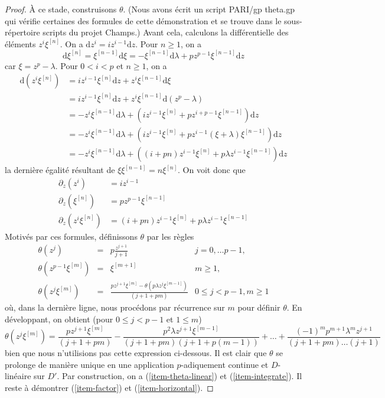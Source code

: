 \begin{proof}
\medskip\noindent
À ce stade, construisons $\theta$. (Nous avons écrit un script PARI/gp theta.gp
qui vérifie certaines des formules de cette démonstration et se trouve dans le
sous-répertoire scripts du projet Champs.) Avant cela, calculons
la différentielle des éléments $z^i \xi^{[n]}$. On a
$\text{d}z^i = i z^{i - 1} \text{d}z$. Pour $n \geq 1$, on a
$$
\text{d}\xi^{[n]} =
\xi^{[n - 1]} \text{d}\xi =
- \xi^{[n - 1]}\text{d}\lambda + p z^{p - 1} \xi^{[n - 1]}\text{d}z
$$
car $\xi = z^p - \lambda$. Pour $0 < i < p$ et $n \geq 1$, on a
\begin{align*}
\text{d}(z^i\xi^{[n]})
& =
iz^{i - 1}\xi^{[n]}\text{d}z + z^i\xi^{[n - 1]}\text{d}\xi \\
& =
iz^{i - 1}\xi^{[n]}\text{d}z + z^i\xi^{[n - 1]}\text{d}(z^p - \lambda) \\
& =
- z^i\xi^{[n - 1]}\text{d}\lambda +
(iz^{i - 1}\xi^{[n]} + pz^{i + p - 1}\xi^{[n - 1]})\text{d}z \\
& =
- z^i\xi^{[n - 1]}\text{d}\lambda +
(iz^{i - 1}\xi^{[n]} + pz^{i - 1}(\xi + \lambda)\xi^{[n - 1]})\text{d}z \\
& =
- z^i\xi^{[n - 1]}\text{d}\lambda +
((i + pn)z^{i - 1}\xi^{[n]} + p\lambda z^{i - 1}\xi^{[n - 1]})\text{d}z
\end{align*}
la dernière égalité résultant de $\xi \xi^{[n - 1]} = n\xi^{[n]}$.
On voit donc que
\begin{align*}
\partial_z(z^i) & = i z^{i - 1} \\
\partial_z(\xi^{[n]}) & = p z^{p - 1} \xi^{[n - 1]} \\
\partial_z(z^i\xi^{[n]}) & =
(i + pn) z^{i - 1} \xi^{[n]} + p \lambda z^{i - 1}\xi^{[n - 1]}
\end{align*}
Motivés par ces formules, définissons $\theta$ par les règles
$$
\begin{matrix}
\theta(z^j)
& = & p\frac{z^{j + 1}}{j + 1}
& j = 0, \ldots p - 1, \\
\theta(z^{p - 1}\xi^{[m]})
& = & \xi^{[m + 1]}
& m \geq 1, \\
\theta(z^j \xi^{[m]})
& = &
\frac{p z^{j + 1} \xi^{[m]} - \theta(p\lambda z^j \xi^{[m - 1]})}{(j + 1 + pm)}
& 0 \leq j < p - 1, m \geq 1
\end{matrix}
$$
où, dans la dernière ligne, nous procédons par récurrence sur $m$ pour définir $\theta$.
En développant, on obtient (pour $0 \leq j < p - 1$ et $1 \leq m$)
$$
\theta(z^j \xi^{[m]}) =
\textstyle{\frac{p z^{j + 1} \xi^{[m]}}{(j + 1 + pm)} -
\frac{p^2 \lambda z^{j + 1} \xi^{[m - 1]}}{(j + 1 + pm)(j + 1 + p(m - 1))} +
\ldots +
\frac{(-1)^m p^{m + 1} \lambda^m z^{j + 1}}
{(j + 1 + pm) \ldots (j + 1)}}
$$
bien que nous n'utilisions pas cette expression ci-dessous. Il est clair que $\theta$
se prolonge de manière unique en une application $p$-adiquement continue et $D$-linéaire sur $D'$.
Par construction, on a (\ref{item-theta-linear}) et (\ref{item-integrate}).
Il reste à démontrer (\ref{item-factor}) et (\ref{item-horizontal}).


\end{proof}
